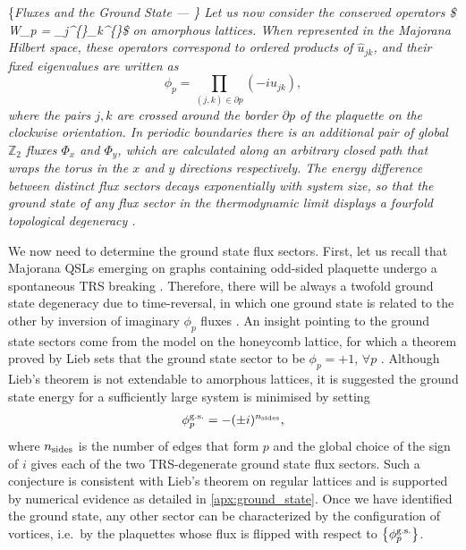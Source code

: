 \{\it Fluxes and the Ground State --- \} Let us now consider the
conserved operators \$ W\_p =
\prod \sigma\_j\^{}\{\alpha\}\sigma\_k\^{}\{\alpha\}\$ on amorphous
lattices. When represented in the Majorana Hilbert space, these
operators correspond to ordered products of \(\hat u_{jk}\), and their
fixed eigenvalues are written as
\begin{equation} \label{eqn:flux_definition}
    \phi_p = \prod_{(j,k) \in \partial p} (-iu_{jk}),
\end{equation} where the pairs \(j,k\) are crossed around the border
\(\partial p\) of the plaquette on the \textit{clockwise} orientation.
In periodic boundaries there is an additional pair of global
\(\mathbb{Z}_2\) fluxes \(\Phi_x\) and \(\Phi_y\), which are calculated
along an arbitrary closed path that wraps the torus in the \(x\) and
\(y\) directions respectively. The energy difference between distinct
flux sectors decays exponentially with system size, so that the ground
state of any flux sector in the thermodynamic limit displays a fourfold
topological degeneracy \cite{kitaev_fault-tolerant_2003}.

\par

We now need to determine the ground state flux sectors. First, let us
recall that Majorana QSLs emerging on graphs containing odd-sided
plaquette undergo a spontaneous TRS breaking
\cite{Chua2011,yaoExactChiralSpin2007,ChuaPRB2011,Fiete2012,Natori2016,Wu2009,Peri2020, WangHaoranPRB2021}.
Therefore, there will be always a twofold ground state degeneracy due to
time-reversal, in which one ground state is related to the other by
inversion of imaginary \(\phi_p\) fluxes \cite{yaoExactChiralSpin2007}.
An insight pointing to the ground state sectors come from the model on
the honeycomb lattice, for which a theorem proved by Lieb sets that the
ground state sector to be \(\phi_p=+1\), \(\forall p\)
\cite{lieb_flux_1994}. Although Lieb's theorem is not extendable to
amorphous lattices, it is suggested the ground state energy for a
sufficiently large system is minimised by setting \cite{OBrienPRB2016}
\begin{align} \label{eqn:gnd_flux}
    \phi_p^{\textup{g.s.}} = -(\pm i)^{n_{\textup{sides}}},
\end{align} where \(n_{\textup{sides}}\) is the number of edges that
form \(p\) and the global choice of the sign of \(i\) gives each of the
two TRS-degenerate ground state flux sectors. Such a conjecture is
consistent with Lieb's theorem on regular lattices \cite{lieb_flux_1994}
and is supported by numerical evidence as detailed in
\cref{apx:ground_state}. Once we have identified the ground state, any
other sector can be characterized by the configuration of vortices,
i.e.~by the plaquettes whose flux is flipped with respect to
\(\left\{\phi_p^{\textup{g.s.}}\right\}\).

